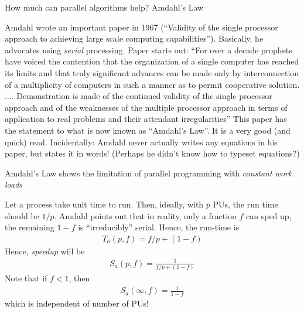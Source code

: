 \documentclass[aspectratio=169]{beamer}
\newcommand{\mypause}{}
\begin{document}
\begin{frame}{How much can parallel algorithms help? Amdahl's Law}

  Amdahl wrote an important paper in 1967 (``Validity of the single
  processor approach to achieving large scale computing
  capabilities''). Basically, he advocates using \emph{serial}
  processing. Paper starts out: {\color{blue} ``For over a decade
    prophets have voiced the contention that the organization of a
    single computer has reached its limits and that truly significant
    advances can be made only by interconnection of a multiplicity of
    computers in such a manner as to permit cooperative
    solution. .... Demonstration is made of the continued validity of
    the single processor approach and of the weaknesses of the
    multiple processor approach in terms of application to real
    problems and their attendant irregularities''}%
  \vskip0.1in%
  This paper has the statement to what is now known as ``Amdahl's
  Law''. It is a very good (and quick) read.%
  \vskip0.1in%
  \mypause%
  Incidentally: Amdahl never actually writes any equations in his
  paper, but states it in words! (Perhaps he didn't know how to
  typeset equations?)

\end{frame}

\begin{frame}{Amdahl's Law shows the limitation of parallel
    programming with \emph{constant work loads}}

  Let a process take unit time to run. Then, ideally, with $p$ PUs,
  the run time should be $1/p$. Amdahl points out that in reality,
  only a fraction $f$ can sped up, the remaining $1-f$ is
  ``irreducibly'' serial. Hence, the run-time is
  \begin{align*}
    T_a(p,f) = f/p + (1-f)
  \end{align*}
  Hence, \emph{speedup} will be
  \begin{align*}
    S_a(p,f) = \frac{1}{f/p + (1-f)}
  \end{align*}
  Note that if $f<1$, then
  \begin{align*}
    S_a(\infty,f) = \frac{1}{1-f}
  \end{align*}
  which is independent of number of PUs!

\end{frame}
\end{document}
